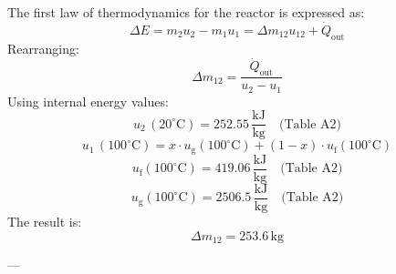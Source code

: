 The first law of thermodynamics for the reactor is expressed as:  
\[
\Delta E = m_{2} u_{2} - m_{1} u_{1} = \Delta m_{12} u_{12} + \dot{Q}_{\text{out}}
\]  
Rearranging:  
\[
\Delta m_{12} = \frac{\dot{Q}_{\text{out}}}{u_{2} - u_{1}}
\]  
Using internal energy values:  
\[
u_{2} \, (20^\circ\text{C}) = 252.55 \, \frac{\text{kJ}}{\text{kg}} \quad \text{(Table A2)}
\]  
\[
u_{1} \, (100^\circ\text{C}) = x \cdot u_{\text{g}}(100^\circ\text{C}) + (1-x) \cdot u_{\text{f}}(100^\circ\text{C})
\]  
\[
u_{\text{f}}(100^\circ\text{C}) = 419.06 \, \frac{\text{kJ}}{\text{kg}} \quad \text{(Table A2)}
\]  
\[
u_{\text{g}}(100^\circ\text{C}) = 2506.5 \, \frac{\text{kJ}}{\text{kg}} \quad \text{(Table A2)}
\]  
The result is:  
\[
\Delta m_{12} = 253.6 \, \text{kg}
\]  

---